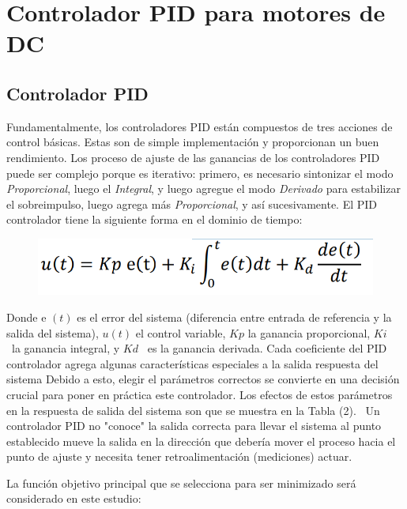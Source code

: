 
\chapter{Controlador \textsc{PID} para motores de \textsc{DC}} %

\label{AppendixA} %

\section{Controlador \textsc{PID}}

Fundamentalmente, los controladores \textsc{PID} est\'an compuestos de tres
acciones de control b\'asicas. Estas son de simple implementaci\'on y
proporcionan un buen rendimiento. Los proceso de ajuste de las ganancias de los controladores 
PID puede ser complejo porque es iterativo: primero, es necesario sintonizar el modo 
\emph{Proporcional}, luego el \emph{Integral}, y luego agregue el modo
\emph{Derivado} para estabilizar el sobreimpulso, luego agrega más
\emph{Proporcional}, y así sucesivamente. El PID controlador tiene la siguiente forma en el dominio de tiempo:
\begin{figure}[th]
    \centering
    \includegraphics[width=.7\textwidth]{Figures/eq1.png}
    \label{fig:eqpid}
\end{figure}
Donde e $(t)$ es el error del sistema (diferencia entre
entrada de referencia y la salida del sistema), $u(t)$ el control
variable, $Kp$ la ganancia proporcional, $Ki$
 la ganancia integral,
y $Kd$
 es la ganancia derivada. Cada coeficiente del \textsc{PID}
controlador agrega algunas caracter\'isticas especiales a la salida
respuesta del sistema Debido a esto, elegir el
par\'ametros correctos se convierte en una decisi\'on crucial para poner
en pr\'actica este controlador. Los efectos de estos
par\'ametros en la respuesta de salida del sistema son
que se muestra en la Tabla (2).
 Un controlador PID no "conoce" la salida correcta
para llevar el sistema al punto establecido mueve la salida
en la direcci\'on que deber\'ia mover el proceso hacia
el punto de ajuste y necesita tener retroalimentaci\'on (mediciones)
actuar.

La funci\'on objetivo principal que se selecciona para ser
minimizado ser\'a considerado en este estudio:

